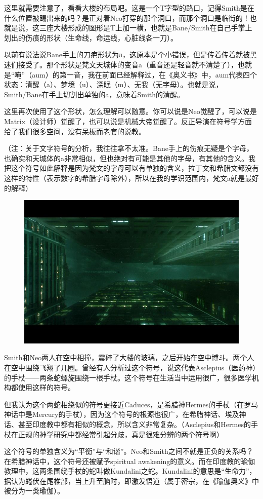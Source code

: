 \documentclass[UTF8]{ctexart}
\begin{document}
这里就需要注意了，看看大楼的布局吧。这是一个T字型的路口，记得Smith是在什么位置被踢出来的吗？是正对着Neo打穿的那个洞口，而那个洞口是临街的！也就是说，这三座大楼形成的图形是T上加一横，也就是Bane/Smith在自己手掌上划出的伤痕的形状（生命线，命运线，心脏线各一刀）。

以前有说法说Bane手上的刀疤形状为π，这原本是个小错误，但是传着传着就被黑迷们接受了。那个形状是梵文天城体的变音a（重音还是轻音就不清楚了），也就是“唵”（aum）的第一音，我在前面已经解释过，在《奥义书》中，aum代表四个状态：清醒（a）、梦境（u）、深眠（m）、无我（无字母）。也就是说，Smith/Bane在手上切割出单独的a，意味着Smith的清醒。

这里再次使用了这个形状，怎么理解可以随意。你可以说是Neo觉醒了，可以说是Matrix（设计师）觉醒了，也可以说是机械大帝觉醒了。反正导演在符号学方面给了我们很多空间，没有呆板而老套的说教。

（注：关于文字符号的分析，我往往拿不太准。Bane手上的伤痕无疑是个字母，也确实和天城体的a非常相似，但也绝对有可能是其他的字母，有其他的含义。我把这个符号如此解释是因为梵文的字母可以有单独的含义，拉丁文和希腊文都没有这样的特性（表示数字的希腊字母除外），所以在我的学识范围内，梵文a就是最好的解释）

\begin{figure}[htb]
\centering
\includegraphics[width=0.5\linewidth]{fig/5fe26438c566852096ddd873.jpg}
\end{figure}

Smith和Neo两人在空中相撞，震碎了大楼的玻璃，之后开始在空中博斗。两个人在空中围绕飞翔了几圈。曾经有人分析过这个符号，说这代表Asclepius（医药神）的手杖——两条蛇螺旋围绕一根手杖。这个符号在生活当中运用很广，很多医学机构都使用这样的符号。

但我认为这个两蛇相绕似的符号更接近Caduces，是希腊神Hermes的手杖（在罗马神话中是Mercury的手杖），因为这个符号的根源也很广，在希腊神话、埃及神话、甚至印度教中都有相似的概念，所以含义非常复杂。（Asclepius和Hermes的手杖在正规的神学研究中都经常引起分歧，真是很难分辨的两个符号啊）

这个符号的单独含义为“平衡”与“和谐”。Neo和Smith之间不就是正负的关系吗？在希腊神话中，这个符号还被赋予spiritual awakening的意义。而在印度教的瑜伽教理中，这两条围绕手杖的蛇叫做Kundalini之蛇。Kundalini的意思是“生命力”，据认为蜷伏在尾椎部，当上升至脑时，即激发悟道（属于密宗，在《瑜伽奥义》中被分为一类瑜伽）。
\end{document}
